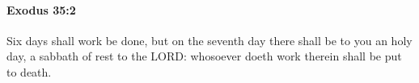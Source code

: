
		\paragraph{Exodus 35:2} %
			\label{EXODUS-35-2}

			Six days shall work be done, but on the seventh day there shall be to you an holy day, a sabbath of rest to the LORD: whosoever doeth work therein shall be put to death.


